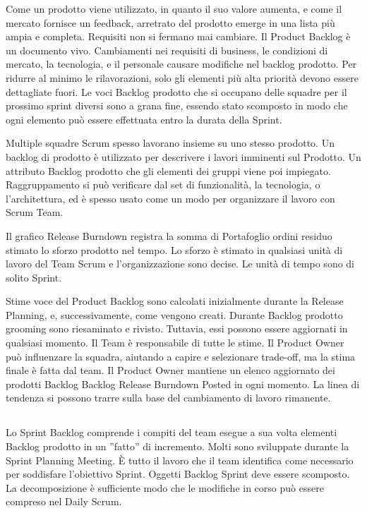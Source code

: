 Come un prodotto viene utilizzato, in quanto il suo valore aumenta, e come il mercato fornisce un feedback, arretrato
del prodotto emerge in una lista pi\`u ampia e completa. Requisiti non si fermano mai cambiare. Il Product Backlog \`e
un documento vivo. Cambiamenti nei requisiti di business, le condizioni di mercato, la tecnologia, e il personale
causare modifiche nel backlog prodotto. Per ridurre al minimo le rilavorazioni, solo gli elementi pi\`u alta priorit\`a
devono essere dettagliate fuori. Le voci Backlog prodotto che si occupano delle squadre per il prossimo sprint diversi
sono a grana fine, essendo stato scomposto in modo che ogni elemento pu\`o essere effettuata entro la durata della
Sprint.


Multiple squadre Scrum spesso lavorano insieme su uno stesso prodotto. Un backlog di prodotto \`e utilizzato per
descrivere i lavori imminenti sul Prodotto. Un attributo Backlog prodotto che gli elementi dei gruppi viene poi
impiegato. Raggruppamento si pu\`o verificare dal set di funzionalit\`a, la tecnologia, o l'architettura, ed \`e spesso
usato come un modo per organizzare il lavoro con Scrum Team.


Il grafico Release Burndown registra la somma di Portafoglio ordini residuo stimato lo sforzo prodotto nel tempo. Lo
sforzo \`e stimato in qualsiasi unit\`a di lavoro del Team Scrum e l'organizzazione sono decise. Le unit\`a di tempo
sono di solito Sprint.\\ 
\linebreak

Stime voce del Product Backlog sono calcolati inizialmente durante la Release Planning, e, successivamente, come
vengono creati. Durante Backlog prodotto grooming sono riesaminato e rivisto. Tuttavia, essi possono essere aggiornati
in qualsiasi momento. Il Team \`e responsabile di tutte le stime. Il Product Owner pu\`o influenzare la squadra,
aiutando a capire e selezionare trade-off, ma la stima finale \`e fatta dal team. Il Product Owner mantiene un elenco
aggiornato dei prodotti Backlog Backlog Release Burndown Posted in ogni momento. La linea di tendenza si possono trarre
sulla base del cambiamento di lavoro rimanente.


\subsection*{\color{Blue}{SPRINT BACKLOG E SPRINT BURNDOWN}}
\label{sec:sprintbacklog}
Lo Sprint Backlog comprende i compiti del team esegue a sua volta elementi Backlog prodotto in un ''fatto'' di
incremento. Molti sono sviluppate durante la Sprint Planning Meeting. \`E tutto il lavoro che il team identifica come
necessario per soddisfare l'obiettivo Sprint. Oggetti Backlog Sprint deve essere scomposto. La decomposizione \`e
sufficiente modo che le modifiche in corso pu\`o essere compreso nel Daily Scrum.

